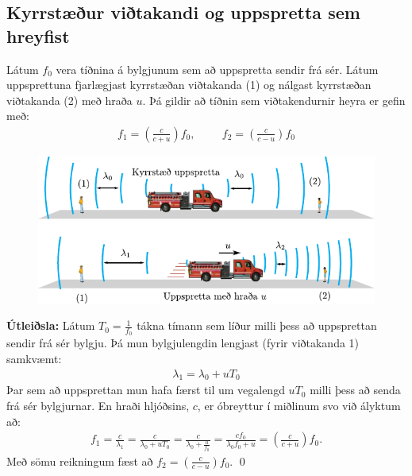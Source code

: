 \subsection*{Kyrrstæður viðtakandi og uppspretta sem hreyfist}

\begin{tcolorbox}
\begin{theorem}
Látum $f_0$ vera tíðnina á bylgjunum sem að uppspretta sendir frá sér. Látum uppsprettuna fjarlægjast kyrrstæðan viðtakanda (1) og nálgast kyrrstæðan viðtakanda (2) með hraða $u$. Þá gildir að tíðnin sem viðtakendurnir heyra er gefin með:
\begin{align*}
    f_1 = \left( \frac{c}{c + u} \right)f_0, \hspace{1cm} f_2 = \left( \frac{c}{c - u} \right)f_0
\end{align*}
\begin{figure}[H]
    \centering
    \vspace{-0.5cm}
    \includegraphics[scale = 0.8]{figures/doppler-brunabill.pdf}
\end{figure}
\end{theorem}
\end{tcolorbox}

\textbf{Útleiðsla:} Látum $T_0 = \frac{1}{f_0}$ tákna tímann sem líður milli þess að uppsprettan sendir frá sér bylgju. Þá mun bylgjulengdin lengjast (fyrir viðtakanda 1) samkvæmt:
\begin{align*}
    \lambda_1 = \lambda_0 + uT_0
\end{align*}
Þar sem að uppsprettan mun hafa færst til um vegalengd $uT_0$ milli þess að senda frá sér bylgjurnar. En hraði hljóðsins, $c$, er óbreyttur í miðlinum svo við ályktum að:
\begin{align*}
    f_1 = \frac{c}{\lambda_1} = \frac{c}{\lambda_0 + u T_0} = \frac{c}{\lambda_0 + \frac{u}{f_0}} = \frac{cf_0}{\lambda_0 f_0 + u} = \left(\frac{c}{c+u} \right)f_0.
\end{align*}
Með sömu reikningum fæst að $f_2 = \left(\frac{c}{c-u}\right) f_0$. \qed


